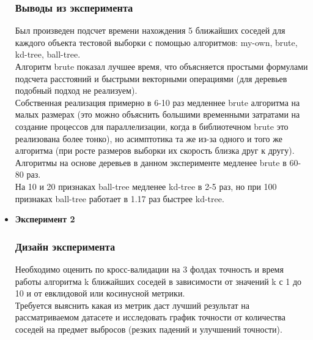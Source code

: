 \documentclass[10pt]{article}
\begin{document}
\begin{itemize}
            \subsubsection*{Выводы из эксперимента}
            {
            	Был произведен подсчет времени нахождения 5 ближайших соседей для каждого объекта тестовой выборки с помощью алгоритмов: my-own, brute, kd-tree, ball-tree.\\
            	Алгоритм brute показал лучшее время, что объясняется простыми формулами  подсчета расстояний и быстрыми векторными операциями (для деревьев подобный подход не реализуем).\\
            	Собственная реализация примерно в 6-10 раз медленнее brute алгоритма на малых размерах (это можно объяснить большими временными затратами на создание процессов для параллелизации, когда в библиотечном brute это реализована более тонко), но асимптотика та же из-за одного и того же алгоритма (при росте размеров выборки их скорость близка друг к другу).\\
            	Алгоритмы на основе деревьев в данном эксперименте медленее brute в 60-80 раз.\\
            	На 10 и 20 признаках ball-tree медленее kd-tree в 2-5 раз, но при 100 признаках ball-tree работает в 1.17 раз быстрее kd-tree.
            }
			
		\item {\bf Эксперимент 2}
		    \subsubsection*{Дизайн эксперимента}
		    {
		    	Необходимо оценить по кросс-валидации на 3 фолдах точность и время работы алгоритма k ближайших соседей в зависимости от значений k с 1 до 10 и от евклидовой или косинусной метрики.\\
		    	Требуется выяснить какая из метрик даст лучший результат на рассматриваемом датасете и исследовать график точности от количества соседей на предмет выбросов (резких падений и улучшений точности).
		    }
		    

\end{itemize}
\end{document}
